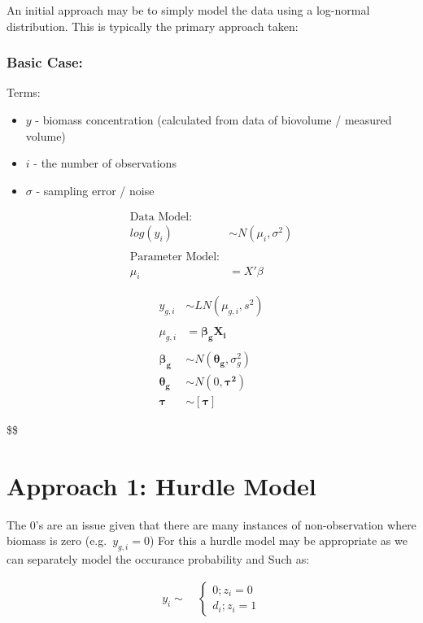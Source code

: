 \documentclass[
  letterpaper,
  DIV=11,
  numbers=noendperiod]{scrartcl}
\begin{document}
An initial approach may be to simply model the data using a log-normal
distribution. This is typically the primary approach taken:

\subsubsection{Basic Case:}\label{basic-case}

Terms:

\begin{itemize}
\item
  \(y\) - biomass concentration (calculated from data of biovolume /
  measured volume)
\item
  \(i\) - the number of observations
\item
  \(\sigma\) - sampling error / noise
\end{itemize}

\begin{align}
    \text{Data Model:}\\
    log(y_i) &\sim N(\mu_i, \sigma^2)\\
    \\
    \text{Parameter Model:}\\
    \mu_i &= X'\beta
\end{align}

\begin{align}
    y_{g,i} &\sim LN(\mu_{g,i}, s^2)\\
    \\
    \mu_{g,i} &= \pmb{\beta_g X_i}\\
    \\
    \pmb{\beta_g} &\sim N(\pmb{\theta_g}, \sigma^2_g)\\
    \pmb{\theta_g} &\sim N(0, \pmb{\tau^2})\\
    \pmb{\tau} &\sim [\pmb{\tau}]
\end{align}

\$\$

\section{Approach 1: Hurdle Model}\label{approach-1-hurdle-model}

The 0's are an issue given that there are many instances of
non-observation where biomass is zero (e.g.~\(y_{g,i} = 0\)) For this a
hurdle model may be appropriate as we can separately model the occurance
probability and Such as:

\[
\begin{align}
    y_{i} \sim \ &\left\{ 
        \begin{array}{l}
            0; z_i = 0\\
            d_i; z_i = 1
        \end{array} \right.
\end{align}
\]
\end{document}
